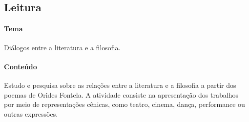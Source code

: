 \documentclass[12pt]{extarticle}
\begin{document}
\subsection{Leitura}

%
%
%
%
%
%

\paragraph{Tema} Diálogos entre a literatura e a filosofia.

\paragraph{Conteúdo} Estudo e pesquisa sobre as relações entre a
literatura e a filosofia a partir dos poemas de Orides Fontela. A
atividade consiste na apresentação dos trabalhos por meio de
representações cênicas, como teatro, cinema, dança, performance ou
outras expressões.
\end{document}
